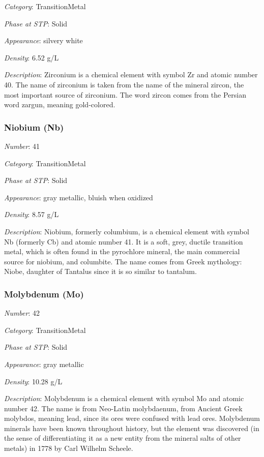 \documentclass{article}
\begin{document}
\textit{Category}: TransitionMetal

\textit{Phase at STP}: Solid

\textit{Appearance}: silvery white

\textit{Density}: 6.52 g/L

\textit{Description}: Zirconium is a chemical element with symbol Zr and atomic number 40. The name of zirconium is taken from the name of the mineral zircon, the most important source of zirconium. The word zircon comes from the Persian word zargun, meaning gold-colored.

\hypertarget{subsubsection::Nb}{}\subsubsection{Niobium (Nb)}

\textit{Number}: 41

\textit{Category}: TransitionMetal

\textit{Phase at STP}: Solid

\textit{Appearance}: gray metallic, bluish when oxidized

\textit{Density}: 8.57 g/L

\textit{Description}: Niobium, formerly columbium, is a chemical element with symbol Nb (formerly Cb) and atomic number 41. It is a soft, grey, ductile transition metal, which is often found in the pyrochlore mineral, the main commercial source for niobium, and columbite. The name comes from Greek mythology: Niobe, daughter of Tantalus since it is so similar to tantalum.

\hypertarget{subsubsection::Mo}{}\subsubsection{Molybdenum (Mo)}

\textit{Number}: 42

\textit{Category}: TransitionMetal

\textit{Phase at STP}: Solid

\textit{Appearance}: gray metallic

\textit{Density}: 10.28 g/L

\textit{Description}: Molybdenum is a chemical element with symbol Mo and atomic number 42. The name is from Neo-Latin molybdaenum, from Ancient Greek molybdos, meaning lead, since its ores were confused with lead ores. Molybdenum minerals have been known throughout history, but the element was discovered (in the sense of differentiating it as a new entity from the mineral salts of other metals) in 1778 by Carl Wilhelm Scheele.
\end{document}
